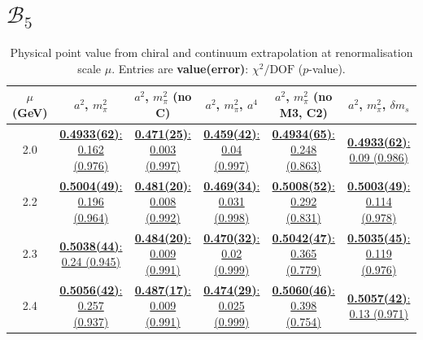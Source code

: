 \documentclass[12pt]{extarticle}
\begin{document}
\section{$\mathcal{B}_5$}
\begin{table}[h!]
\begin{center}
\begin{tabular}{|c|c|c|c|c|c|}
\hline
$\mu$ (GeV) & $a^2$, $m_\pi^2$& $a^2$, $m_\pi^2$ (no C)& $a^2$, $m_\pi^2$, $a^4$& $a^2$, $m_\pi^2$ (no M3, C2)& $a^2$, $m_\pi^2$, $\delta m_s$\\
\hline
2.0& \hyperlink{TT/SUSY/bag_a2m2_20.pdf.1}{\textbf{0.4933(62)}: 0.162 (0.976)} & \hyperlink{TT/SUSY/bag_a2m2noC_20.pdf.1}{\textbf{0.471(25)}: 0.003 (0.997)} & \hyperlink{TT/SUSY/bag_a2a4m2_20.pdf.1}{\textbf{0.459(42)}: 0.04 (0.997)} & \hyperlink{TT/SUSY/bag_a2m2mcut_20.pdf.1}{\textbf{0.4934(65)}: 0.248 (0.863)} & \hyperlink{TT/SUSY/bag_a2m2delm_20.pdf.1}{\textbf{0.4933(62)}: 0.09 (0.986)}\\
2.2& \hyperlink{TT/SUSY/bag_a2m2_22.pdf.1}{\textbf{0.5004(49)}: 0.196 (0.964)} & \hyperlink{TT/SUSY/bag_a2m2noC_22.pdf.1}{\textbf{0.481(20)}: 0.008 (0.992)} & \hyperlink{TT/SUSY/bag_a2a4m2_22.pdf.1}{\textbf{0.469(34)}: 0.031 (0.998)} & \hyperlink{TT/SUSY/bag_a2m2mcut_22.pdf.1}{\textbf{0.5008(52)}: 0.292 (0.831)} & \hyperlink{TT/SUSY/bag_a2m2delm_22.pdf.1}{\textbf{0.5003(49)}: 0.114 (0.978)}\\
2.3& \hyperlink{TT/SUSY/bag_a2m2_23.pdf.1}{\textbf{0.5038(44)}: 0.24 (0.945)} & \hyperlink{TT/SUSY/bag_a2m2noC_23.pdf.1}{\textbf{0.484(20)}: 0.009 (0.991)} & \hyperlink{TT/SUSY/bag_a2a4m2_23.pdf.1}{\textbf{0.470(32)}: 0.02 (0.999)} & \hyperlink{TT/SUSY/bag_a2m2mcut_23.pdf.1}{\textbf{0.5042(47)}: 0.365 (0.779)} & \hyperlink{TT/SUSY/bag_a2m2delm_23.pdf.1}{\textbf{0.5035(45)}: 0.119 (0.976)}\\
2.4& \hyperlink{TT/SUSY/bag_a2m2_24.pdf.1}{\textbf{0.5056(42)}: 0.257 (0.937)} & \hyperlink{TT/SUSY/bag_a2m2noC_24.pdf.1}{\textbf{0.487(17)}: 0.009 (0.991)} & \hyperlink{TT/SUSY/bag_a2a4m2_24.pdf.1}{\textbf{0.474(29)}: 0.025 (0.999)} & \hyperlink{TT/SUSY/bag_a2m2mcut_24.pdf.1}{\textbf{0.5060(46)}: 0.398 (0.754)} & \hyperlink{TT/SUSY/bag_a2m2delm_24.pdf.1}{\textbf{0.5057(42)}: 0.13 (0.971)}\\
\hline
\end{tabular}
\caption{Physical point value from chiral and continuum extrapolation at renormalisation scale $\mu$. Entries are \textbf{value(error)}: $\chi^2/\text{DOF}$ ($p$-value).}
\end{center}
\end{table}
\end{document}
